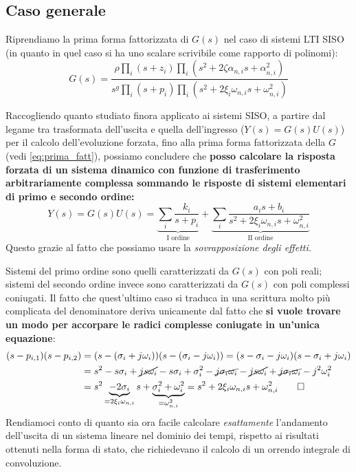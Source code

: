\subsection{Caso generale}
Riprendiamo la prima forma fattorizzata di $G(s)$ nel caso di sistemi LTI SISO (in quanto in quel caso si ha uno scalare scrivibile come rapporto di polinomi):
\begin{equation*}
G(s) = \frac{\rho \prod_i (s+z_i)\prod_i (s^2+2\zeta \alpha_{n,i}s+\alpha^2_{n,i})}{s^g \prod_i(s+p_i) \prod_i(s^2+2\xi_i \omega_{n,i}s + \omega^2_{n,i})}
\end{equation*}
\begin{defin}{}{}
Raccogliendo quanto studiato finora applicato ai sistemi SISO, a partire dal legame tra trasformata dell'uscita e quella dell'ingresso ($Y(s)=G(s)U(s)$) per il calcolo dell'evoluzione forzata, fino alla prima forma fattorizzata della $G$ (vedi \eqref{eq:prima_fatt}), possiamo concludere che \textbf{posso calcolare la risposta forzata di un sistema dinamico con funzione di trasferimento arbitrariamente complessa sommando le risposte di sistemi elementari di primo e secondo ordine:}
\begin{equation}
Y(s) = G(s)U(s) = \underbrace{\sum_i \frac{k_i}{s+p_i}}_{\textrm{I ordine}} + \underbrace{\sum_i \frac{a_i s + b_i}{s^2 + 2\xi_i\omega_{n,i}s+\omega_{n,i}^2}}_{\textrm{II ordine}}
\end{equation}
Questo grazie al fatto che possiamo usare la \textit{sovrapposizione degli effetti.}
\end{defin}
Sistemi del primo ordine sono quelli caratterizzati da $G(s)$ con poli reali; sistemi del secondo ordine invece sono caratterizzati da $G(s)$ con poli complessi coniugati. Il fatto che quest'ultimo caso si traduca in una scrittura molto più complicata del denominatore deriva unicamente dal fatto che \textbf{si vuole trovare un modo per accorpare le radici complesse coniugate in un'unica equazione}:
\begin{align*}
(s-p_{i,1})(s-p_{i,2}) & = (s-(\sigma_i +j\omega_i))(s-(\sigma_i - j\omega_i)) = (s-\sigma_i -j\omega_i)(s-\sigma_i + j\omega_i) \\ & = s^2 - s\sigma_i +\cancel{js\omega_i} - s\sigma_i + \sigma_i^2-\cancel{j\sigma_i\omega_i} - \cancel{js\omega_i}+\cancel{j\sigma_i\omega_i} - j^2\omega_i^2 \\ & = s^2\underbrace{-2\sigma_i}_{=2\xi_i \omega_{n,i}} s + \underbrace{\sigma_i^2+\omega_i^2}_{=\omega_{n,i}^2}= s^2 + 2\xi_i\omega_{n,i}s+\omega_{n,i}^2 \qed
\end{align*}
\bb
Rendiamoci conto di quanto sia ora facile calcolare \textit{esattamente} l'andamento dell'uscita di un sistema lineare nel dominio dei tempi, rispetto ai risultati ottenuti nella forma di stato, che richiedevano il calcolo di un orrendo integrale di convoluzione. 

